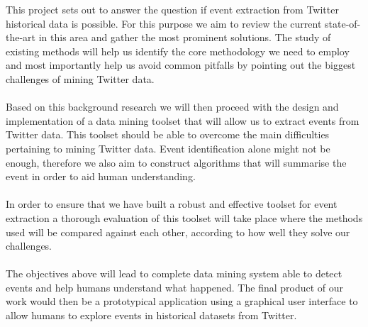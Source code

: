 This project sets out to answer the question if event extraction from Twitter historical data is possible. For this purpose 
we aim to review the current state-of-the-art in this area and gather the most prominent solutions. The study of existing methods will
help us identify the core methodology we need to employ and most importantly help us avoid common pitfalls by pointing out the biggest challenges
of mining Twitter data.\\\\
Based on this background research we will then proceed with the design and implementation of a data mining toolset that will allow us 
to extract events from Twitter data. This toolset should be able to overcome the main difficulties pertaining to mining Twitter data. 
Event identification alone might not be enough, therefore we also aim to construct algorithms that will summarise the event in order to aid human understanding.\\\\
In order to ensure that we have built a robust and effective toolset for event extraction a thorough evaluation of this toolset will take place where the methods used will be 
compared against each other, according to how well they solve our challenges.\\\\ 
The objectives above will lead to complete data mining system able to detect events and help humans understand what happened. The final product of our work would then be 
a prototypical application using a graphical user interface to allow humans to explore events in historical datasets from Twitter. 

